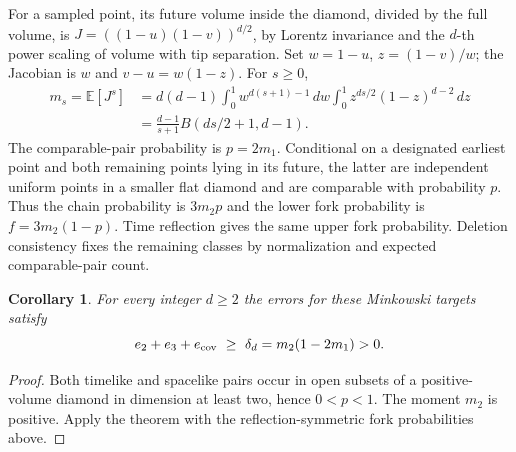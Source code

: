 \documentclass[11pt]{article}
\newtheorem{corollary}{Corollary}
\newcommand{\E}{\mathbb E}
\begin{document}
For a sampled point, its future volume inside the diamond, divided by the full volume, is $J=((1-u)(1-v))^{d/2}$, by Lorentz invariance and the $d$-th power scaling of volume with tip separation. Set $w=1-u$, $z=(1-v)/w$; the Jacobian is $w$ and $v-u=w(1-z)$. For $s\ge0$,
\begin{align*}
m_s=\E[J^s]&=d(d-1)\int_0^1 w^{d(s+1)-1}\,dw\int_0^1 z^{ds/2}(1-z)^{d-2}\,dz\\
&=\frac{d-1}{s+1}B(ds/2+1,d-1).
\end{align*}
The comparable-pair probability is $p=2m_1$. Conditional on a designated earliest point and both remaining points lying in its future, the latter are independent uniform points in a smaller flat diamond and are comparable with probability $p$. Thus the chain probability is $3m_2p$ and the lower fork probability is $f=3m_2(1-p)$. Time reflection gives the same upper fork probability. Deletion consistency fixes the remaining classes by normalization and expected comparable-pair count.
\begin{corollary}
For every integer $d\ge2$ the errors for these Minkowski targets satisfy
\[
e_2+e_3+e_{\rm cov}\ \ge\ \delta_d=m_2(1-2m_1)>0.
\]
\end{corollary}
\begin{proof}
Both timelike and spacelike pairs occur in open subsets of a positive-volume diamond in dimension at least two, hence $0<p<1$. The moment $m_2$ is positive. Apply the theorem with the reflection-symmetric fork probabilities above.
\end{proof}
\end{document}
